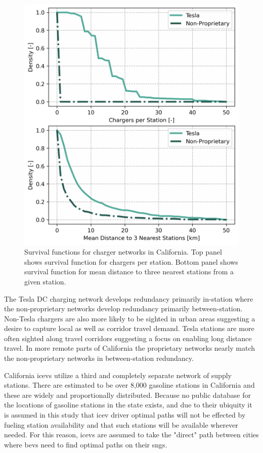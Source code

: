 \documentclass[11pt]{article}
\begin{document}
\begin{multicols}{2}
\begin{figure}[H]
	\centering
	\includegraphics[width = \linewidth]{figs/California_Charger_Network_Survival_Functions.png}
	\caption{Survival functions for charger networks in California. Top panel shows survival function for chargers per station. Bottom panel shows survival function for mean distance to three nearest stations from a given station.}
	\label{fig:network_histograms}
\end{figure}

The Tesla DC charging network develops redundancy primarily in-station where the non-proprietary networks develop redundancy primarily between-station. Non-Tesla chargers are also more likely to be sighted in urban areas suggesting a desire to capture local as well as corridor travel demand. Tesla stations are more often sighted along travel corridors suggesting a focus on enabling long distance travel. In more remote parts of California the proprietary networks nearly match the non-proprietary networks in between-station redundancy.

California \glspl{icev} utilize a third and completely separate network of supply stations. There are estimated to be over 8,000 gasoline stations in California \cite{CEC_2022} and these are widely and proportionally distributed. Because no public database for the locations of gasoline stations in the state exists, and due to their ubiquity it is assumed in this study that \gls{icev} driver optimal paths will not be effected by fueling station availability and that such stations will be available wherever needed. For this reason, \glspl{icev} are assumed to take the "direct" path between cities where \glspl{bev} need to find optimal paths on their \glspl{sng}.


\end{multicols}
\end{document}

